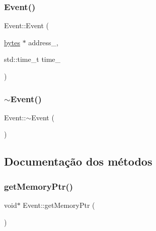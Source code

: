 \subsubsection{\texorpdfstring{Event()}{Event()}}
{\footnotesize\ttfamily Event\+::\+Event (\begin{DoxyParamCaption}\item[{\hyperlink{storagepooltest__exec_8h_a9192c6634956b334d70312524e15a909}{bytes} $\ast$}]{address\+\_\+,  }\item[{std\+::time\+\_\+t}]{time\+\_\+ }\end{DoxyParamCaption})\hspace{0.3cm}{\ttfamily [inline]}}

\mbox{\label{classEvent_a7704ec01ce91e673885792054214b3d2}} 
\subsubsection{\texorpdfstring{$\sim$\+Event()}{~Event()}}
{\footnotesize\ttfamily Event\+::$\sim$\+Event (\begin{DoxyParamCaption}{ }\end{DoxyParamCaption})\hspace{0.3cm}{\ttfamily [inline]}}



\subsection{Documentação dos métodos}
\mbox{\label{classEvent_ad251fb8313c6697932445d151c0fa0e2}} 
\subsubsection{\texorpdfstring{get\+Memory\+Ptr()}{getMemoryPtr()}}
{\footnotesize\ttfamily void$\ast$ Event\+::get\+Memory\+Ptr (\begin{DoxyParamCaption}{ }\end{DoxyParamCaption})\hspace{0.3cm}{\ttfamily [inline]}}

\mbox{\label{classEvent_a10f30e1a322839fe772a6533d8681c4f}} 
